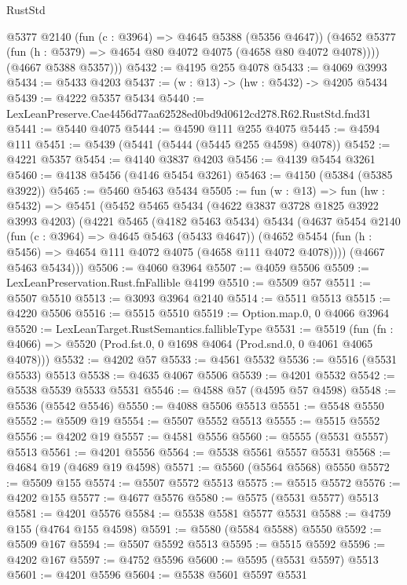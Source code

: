 \begin{lexlean}{RustStd}
\begin{coremodule}
          @5377
          @2140
          (fun (c : @3964) => @4645 @5388 (@5356 @4647))
          (@4652 @5377 (fun (h : @5379) => @4654 @80 @4072 @4075 (@4658 @80 @4072 @4078))))
        (@4667 @5388 @5357)))
@5432 := @4195 @255 @4078
@5433 := @4069 @3993
@5434 := @5433 @4203
@5437 := (w : @13) -> (hw : @5432) -> @4205 @5434
@5439 := @4222 @5357 @5434
@5440 := LexLeanPreserve.Cae4456d77aa62528ed0bd9d0612cd278.R62.RustStd.fnd31
@5441 := @5440 @4075
@5444 := @4590 @111 @255 @4075
@5445 := @4594 @111
@5451 := @5439 (@5441 (@5444 (@5445 @255 @4598) @4078))
@5452 := @4221 @5357
@5454 := @4140 @3837 @4203
@5456 := @4139 @5454 @3261
@5460 := @4138 @5456 (@4146 @5454 @3261)
@5463 := @4150 (@5384 (@5385 @3922))
@5465 := @5460 @5463 @5434
@5505 := fun (w : @13) =>
  fun (hw : @5432) =>
  @5451
    (@5452
      @5465
      @5434
      (@4622 @3837 @3728 @1825 @3922 @3993 @4203)
      (@4221
        @5465
        (@4182 @5463 @5434)
        @5434
        (@4637
          @5454
          @2140
          (fun (c : @3964) => @4645 @5463 (@5433 @4647))
          (@4652 @5454 (fun (h : @5456) => @4654 @111 @4072 @4075 (@4658 @111 @4072 @4078))))
        (@4667 @5463 @5434)))
@5506 := @4060 @3964
@5507 := @4059 @5506
@5509 := LexLeanPreservation.Rust.fnFallible @4199
@5510 := @5509 @57
@5511 := @5507 @5510
@5513 := @3093 @3964 @2140
@5514 := @5511 @5513
@5515 := @4220 @5506
@5516 := @5515 @5510
@5519 := Option.map.{0, 0} @4066 @3964
@5520 := LexLeanTarget.RustSemantics.fallibleType
@5531 := @5519
    (fun (fn : @4066) => @5520 (Prod.fst.{0, 0} @1698 @4064 (Prod.snd.{0, 0} @4061 @4065 @4078)))
@5532 := @4202 @57
@5533 := @4561 @5532
@5536 := @5516 (@5531 @5533) @5513
@5538 := @4635 @4067 @5506
@5539 := @4201 @5532
@5542 := @5538 @5539 @5533 @5531
@5546 := @4588 @57 (@4595 @57 @4598)
@5548 := @5536 (@5542 @5546)
@5550 := @4088 @5506 @5513
@5551 := @5548 @5550
@5552 := @5509 @19
@5554 := @5507 @5552 @5513
@5555 := @5515 @5552
@5556 := @4202 @19
@5557 := @4581 @5556
@5560 := @5555 (@5531 @5557) @5513
@5561 := @4201 @5556
@5564 := @5538 @5561 @5557 @5531
@5568 := @4684 @19 (@4689 @19 @4598)
@5571 := @5560 (@5564 @5568) @5550
@5572 := @5509 @155
@5574 := @5507 @5572 @5513
@5575 := @5515 @5572
@5576 := @4202 @155
@5577 := @4677 @5576
@5580 := @5575 (@5531 @5577) @5513
@5581 := @4201 @5576
@5584 := @5538 @5581 @5577 @5531
@5588 := @4759 @155 (@4764 @155 @4598)
@5591 := @5580 (@5584 @5588) @5550
@5592 := @5509 @167
@5594 := @5507 @5592 @5513
@5595 := @5515 @5592
@5596 := @4202 @167
@5597 := @4752 @5596
@5600 := @5595 (@5531 @5597) @5513
@5601 := @4201 @5596
@5604 := @5538 @5601 @5597 @5531

\end{coremodule}
\end{lexlean}

